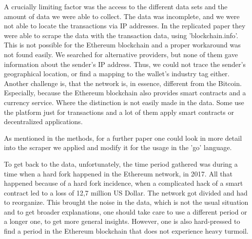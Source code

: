A crucially limiting factor was the access to the different data sets and the amount of data we were able to collect. 
The data was incomplete, and we were not able to locate the transactions via IP addresses. 
In the replicated paper they were able to scrape the data with the transaction data, using 'blockchain.info'. 
This is not possible for the Ethereum blockchain and a proper workaround was not found easily. 
We searched for alternative providers, but none of them gave information about the sender's IP address.
Thus, we could not trace the sender's geographical location, or find a mapping to the wallet's industry tag either. 
Another challenge is, that the network is, in essence, different from the Bitcoin.
Especially, because the Ethereum blockchain also provides smart contracts and a currency service.
Where the distinction is not easily made in the data. 
Some use the platform just for transactions and a lot of them apply smart contracts or decentralized applications. 
 
As mentioned in the methods, for a further paper one could look in more detail into the scraper we applied and modify it for the usage in the 'go' language.

To get back to the data, unfortunately, the time period gathered was during a time when a hard fork happened in the Ethereum network, in 2017. 
All that happened because of a hard fork incidence, when a complicated hack of a smart contract led to a loss of 12,7 million US Dollar.
The network got divided and had to reorganize. 
This brought the noise in the data, which is not the usual situation and to get broader explanations, one should take care to use a different period or a longer one, to get more general insights. However, one is also hard-pressed to find a period in the Ethereum blockchain that does not experience heavy turmoil.